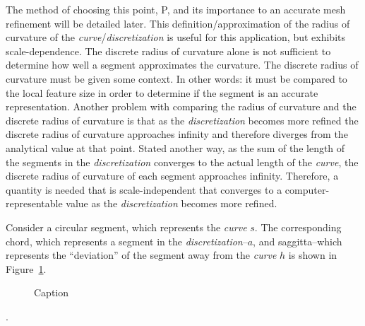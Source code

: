 \noindent The method of choosing this point, P, and its importance to an accurate mesh refinement will be detailed later. This definition/approximation of the radius of curvature of the \textit{curve}/\textit{discretization} is useful for this application, but exhibits scale-dependence. The discrete radius of curvature alone is not sufficient to determine how well a segment approximates the curvature. The discrete radius of curvature must be given some context. In other words: it must be compared to the local feature size in order to determine if the segment is an accurate representation. Another problem with comparing the radius of curvature and the discrete radius of curvature is that as the \textit{discretization} becomes more refined the discrete radius of curvature approaches infinity and therefore diverges from the analytical value at that point. Stated another way, as the sum of the length of the segments in the \textit{discretization} converges to the actual length of the \textit{curve}, the discrete radius of curvature of each segment approaches infinity. Therefore, a quantity is needed that is scale-independent that converges to a computer-representable value as the \textit{discretization} becomes more refined.

Consider a circular segment, which represents the \textit{curve} 
$s$.  The corresponding chord, which represents a segment in the 
\textit{discretization}--$a$, and saggitta--which represents 
the ``deviation'' of the segment away from the \textit{curve} $h$
is shown in Figure~\ref{CircleGeometry}.

\begin{figure}
  \caption{\label{CircleGeometry} Caption}
\end{figure}.

